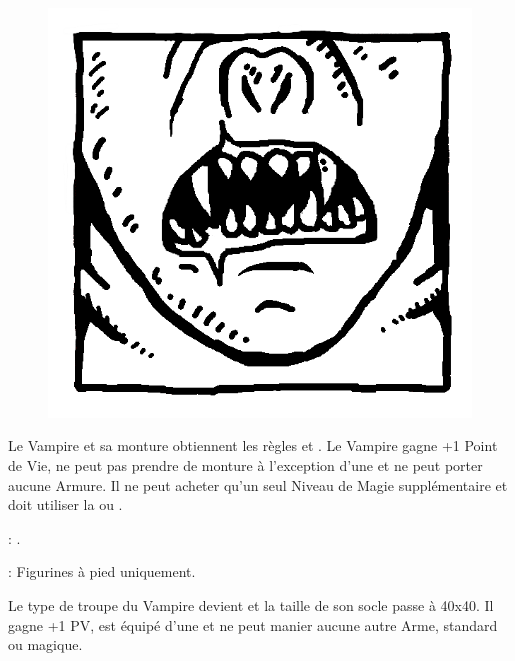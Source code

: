 \begin{figure}
\centering
\includegraphics[width=\logosize]{pics/logo_strigoi.png}
\end{figure}
Le Vampire et sa monture obtiennent les règles  et \hatred{}. Le Vampire gagne +1 Point de Vie, ne peut pas prendre de monture à l'exception d'une \shriekinghorror{} et ne peut porter aucune Armure. Il ne peut acheter qu'un seul Niveau de Magie supplémentaire et doit utiliser la \Pathof{} \wilderness{} ou \necromancy{}.

\vspace{0.5cm}
\bloodties{} : \textbf{\ghouls{}}.

\vspace{0.5cm}
\ancientbloodpower{} : \textbf{\bestialbulk}\dotfill{}\newline%
Figurines à pied uniquement.

\vspace{5pt}\noindent{}Le type de troupe du Vampire devient \monstrousinfantry{} et la taille de son socle passe à \unit{40x40}{\milli\meter}. Il gagne +1 PV, est équipé d'une \pw{} et ne peut manier aucune autre Arme, standard ou magique.


